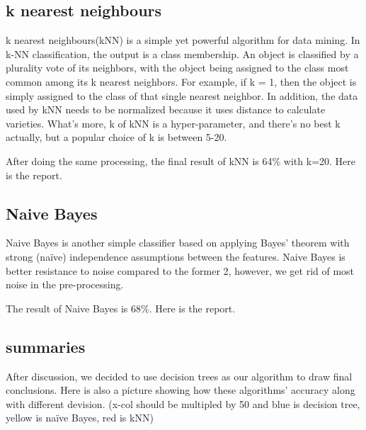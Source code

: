 \documentclass{sig-alternate}
\begin{document}
	\subsection{k nearest neighbours}
	k nearest neighbours(kNN) is a simple yet powerful algorithm for data mining. In k-NN classification, 
	the output is a class membership. An object is classified by a plurality vote of its neighbors, 
	with the object being assigned to the class most common among its k nearest neighbors. For example, if k = 1, 
	then the object is simply assigned to the class of that single nearest neighbor.
	In addition, the data used by kNN needs to be normalized because it uses distance to calculate varieties. 
	What's more, k of kNN is a hyper-parameter, and there's no best k actually, but a popular choice of k is between 5-20.

	After doing the same processing, the final result of kNN is 64\% with k=20. Here is the report.

	\subsection{Naive Bayes}
	Naive Bayes is another simple classifier based on applying Bayes' 
	theorem with strong (naïve) independence assumptions between the features. 
	Naive Bayes is better resistance to noise compared to the former 2, however, we get rid of most
	noise in the pre-processing. 
	
	The result of Naive Bayes is 68\%. Here is the report.

	\subsection{summaries}
	After discussion, we decided to use decision trees as our algorithm to draw final conclusions.
	Here is also a picture showing how these algorithms' accuracy along with different devision.
	(x-col should be multipled by 50 and blue is decision tree, yellow is naïve Bayes, red is kNN)

	
\end{document}
